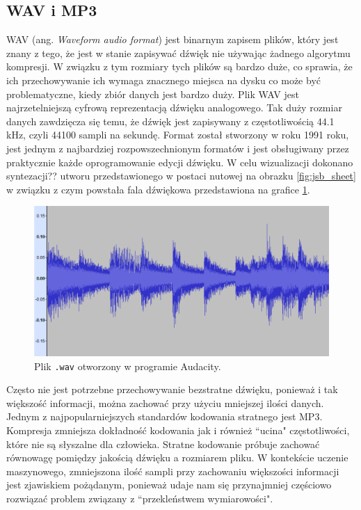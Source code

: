 \documentclass[data-science]{agh-wi} %
\begin{document}
\subsection{WAV i MP3}
WAV (ang. \textit{Waveform audio format}) jest binarnym zapisem plików, który jest znany z tego, że jest w stanie zapisywać dźwięk nie używając żadnego algorytmu kompresji. W związku z tym rozmiary tych plików są bardzo duże, co sprawia, że ich przechowywanie ich wymaga znacznego miejsca na dysku co może być problematyczne, kiedy zbiór danych jest bardzo duży. Plik WAV jest najrzetelniejszą cyfrową reprezentacją dźwięku analogowego. Tak duży rozmiar danych zawdzięcza się temu, że dźwięk jest zapisywany z częstotliwością 44.1 kHz, czyli 44100 sampli na sekundę. Format został stworzony w roku 1991 roku, jest jednym z najbardziej rozpowszechnionym formatów i jest obsługiwany przez praktycznie każde oprogramowanie edycji dźwięku. W celu wizualizacji dokonano syntezacji?? utworu przedstawionego w postaci nutowej na obrazku \ref*{fig:jsb_sheet} w związku z czym powstała fala dźwiękowa przedstawiona na grafice \ref*{fig:jsb_wav}.

\begin{figure}
    \begin{center}
        \includegraphics[width=\linewidth]{./img/jsb_wav.png}
    \end{center}
    \caption{Plik \texttt{.wav} otworzony w programie Audacity.}\label{fig:jsb_wav}
\end{figure}

Często nie jest potrzebne przechowywanie bezstratne dźwięku, ponieważ i tak większość informacji, można zachować przy użyciu mniejszej ilości danych. Jednym z najpopularniejszych standardów kodowania stratnego jest MP3. Kompresja zmniejsza dokładność kodowania jak i również ``ucina" częstotliwości, które nie są słyszalne dla człowieka. Stratne kodowanie próbuje zachować równowagę pomiędzy jakością dźwięku a rozmiarem pliku. W kontekście uczenie maszynowego, zmniejszona ilość sampli przy zachowaniu większości informacji jest zjawiskiem pożądanym, ponieważ udaje nam się przynajmniej częściowo rozwiązać problem związany z ``przekleństwem wymiarowości".
\end{document}
